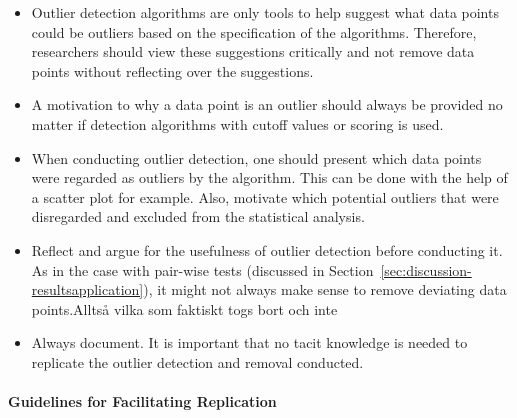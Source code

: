 \begin{itemize}


\item Outlier detection algorithms are only tools to help suggest what data points could be outliers based on the specification of the algorithms. Therefore, researchers should view these suggestions critically and not remove data points without reflecting over the suggestions.


\item A motivation to why a data point is an outlier should always be provided no matter if detection algorithms with cutoff values or scoring is used.


\item When conducting outlier detection, one should present which data points were regarded as outliers by the algorithm. This can be done with the help of a scatter plot for example. Also, motivate which potential outliers that were disregarded and excluded from the statistical analysis.


\item Reflect and argue for the usefulness of outlier detection before conducting it. As in the case with pair-wise tests (discussed in Section~\ref{sec:discussion-resultsapplication}), it might not always make sense to remove deviating data points.Alltså vilka som faktiskt togs bort och inte 


\item Always document. It is important that no tacit knowledge is needed to replicate the outlier detection and removal conducted.


\end{itemize}




\paragraph{Guidelines for Facilitating Replication}


